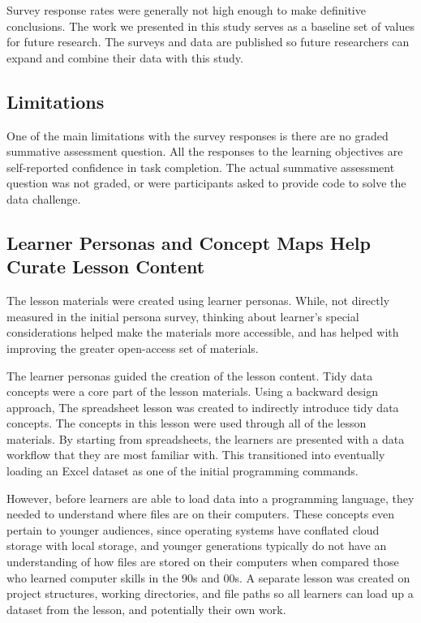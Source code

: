 \documentclass[030-workshop.tex]{subfiles}
\begin{document}
    Survey response rates were generally not high enough to make definitive conclusions.
    The work we presented in this study serves as a baseline set of values for future research.
    The surveys and data are published so future researchers can expand and combine their
    data with this study.

    \subsection{Limitations}

        One of the main limitations with the survey responses is there
        are no graded summative assessment question.
        All the responses to the learning objectives are self-reported confidence in task completion.
        The actual summative assessment question was not graded,
        or were participants asked to provide code to solve the data challenge.

    \subsection{Learner Personas and Concept Maps Help Curate Lesson Content}

        The lesson materials were created using learner personas.
        While, not directly measured in the initial persona survey,
        thinking about learner's special considerations helped make the materials
        more accessible,
        and has helped with improving the greater open-access set of materials.

        The learner personas guided the creation of the lesson content.
        Tidy data concepts were a core part of the lesson materials.
        Using a backward design approach,
        The spreadsheet lesson was created to indirectly introduce tidy data concepts.
        The concepts in this lesson were used through all of the lesson materials.
        By starting from spreadsheets,
        the learners are presented with a data workflow that they are most familiar with.
        This transitioned into eventually loading an Excel dataset as one of the initial programming commands.

        However, before learners are able to load data into a programming language,
        they needed to understand where files are on their computers.
        These concepts even pertain to younger audiences,
        since operating systems have conflated cloud storage with local storage,
        and younger generations typically do not have an understanding of how files are stored on their computers
        when compared those who learned computer skills in the 90s and 00s. %
        A separate lesson was created on project structures, working directories, and file paths
        so all learners can load up a dataset from the lesson, and potentially their own work.
\end{document}
